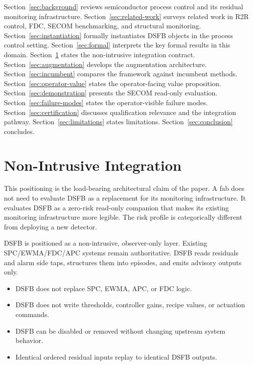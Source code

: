 \documentclass[11pt,letterpaper]{article}
\theoremstyle{scresult}
\begin{document}
Section~\ref{sec:background} reviews semiconductor process control and its
residual monitoring infrastructure. Section~\ref{sec:related-work} surveys
related work in R2R control, FDC, SECOM benchmarking, and structural monitoring.
Section~\ref{sec:instantiation} formally
instantiates DSFB objects in the process control setting.
Section~\ref{sec:formal} interprets the key formal results in this domain.
Section~\ref{sec:nonintrusive} states the non-intrusive integration contract.
Section~\ref{sec:augmentation} develops the augmentation architecture.
Section~\ref{sec:incumbent} compares the framework against incumbent methods.
Section~\ref{sec:operator-value} states the operator-facing value proposition.
Section~\ref{sec:demonstration} presents the SECOM read-only evaluation.
Section~\ref{sec:failure-modes} states the operator-visible failure modes.
Section~\ref{sec:certification} discusses qualification relevance and the
integration pathway. Section~\ref{sec:limitations} states limitations.
Section~\ref{sec:conclusion} concludes.

\section{Non-Intrusive Integration}
\label{sec:nonintrusive}

This positioning is the load-bearing architectural claim of the paper. A fab
does not need to evaluate DSFB as a replacement for its monitoring
infrastructure. It evaluates DSFB as a zero-risk read-only companion that
makes its existing monitoring infrastructure more legible. The risk profile is
categorically different from deploying a new detector.

DSFB is positioned as a non-intrusive, observer-only layer. Existing
SPC/EWMA/FDC/APC systems remain authoritative. DSFB reads residuals and alarm
side taps, structures them into episodes, and emits advisory outputs only.

\begin{itemize}
  \item DSFB does not replace SPC, EWMA, APC, or FDC logic.
  \item DSFB does not write thresholds, controller gains, recipe values, or
        actuation commands.
  \item DSFB can be disabled or removed without changing upstream system
        behavior.
  \item Identical ordered residual inputs replay to identical DSFB outputs.
\end{itemize}
\end{document}
